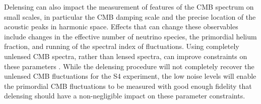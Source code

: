 Delensing can also impact the measurement of features of the CMB spectrum on small scales, in particular the CMB damping scale and the precise location of the acoustic peaks in harmonic space.  Effects that can change these observables include changes in the effective number of neutrino species,  the primordial helium fraction, and running of the spectral index of fluctuations.  Using completely unlensed CMB spectra, rather than lensed spectra, can improve constraints on these parameters \cite{Baumann:2015rya}.  While the delensing procedure will not completely recover the unlensed CMB fluctuations for the S4 experiment, the low noise levels will enable the primordial CMB fluctuations to be measured with good enough fidelity that delensing should have a non-negligible impact on these parameter constraints.
